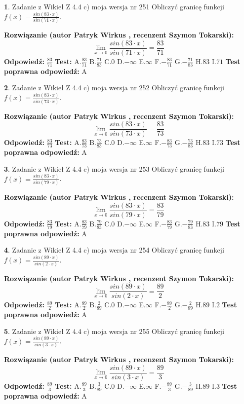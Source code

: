 \documentclass[12pt, a4paper]{article}
\theoremstyle{definition} %
\newtheorem{zad}{}
\newcommand{\zadStart}[1]{\begin{zad}#1\newline}
\newcommand{\zadStop}{\end{zad}}
\newcommand{\rozwStart}[2]{\noindent \textbf{Rozwiązanie (autor #1 , recenzent #2): }\newline}
\newcommand{\rozwStop}{\newline}
\newcommand{\odpStart}{\noindent \textbf{Odpowiedź:}\newline}
\newcommand{\odpStop}{\newline}
\newcommand{\testStart}{\noindent \textbf{Test:}\newline}
\newcommand{\testStop}{\newline}
\newcommand{\kluczStart}{\noindent \textbf{Test poprawna odpowiedź:}\newline}
\newcommand{\kluczStop}{\newline}
\begin{document}
\zadStart{Zadanie z Wikieł Z 4.4 c) moja wersja nr 251}
Obliczyć granicę funkcji $f(x)=\frac{sin(83\cdot x)}{sin(71\cdot x)}$.
\zadStop
\rozwStart{Patryk Wirkus}{Szymon Tokarski}
$$\lim\limits_{x\to 0}\frac{sin(83\cdot x)}{sin(71\cdot x)}=
\frac{83}{71}$$
\rozwStop
\odpStart
$\frac{83}{71}$
\odpStop
\testStart
A.$\frac{83}{71}$
B.$\frac{71}{83}$
C.$0$
D.$-\infty$
E.$\infty$
F.$-\frac{83}{71}$
G.$-\frac{71}{83}$
H.$83$
I.$71$
\testStop
\kluczStart
A
\kluczStop



\zadStart{Zadanie z Wikieł Z 4.4 c) moja wersja nr 252}
Obliczyć granicę funkcji $f(x)=\frac{sin(83\cdot x)}{sin(73\cdot x)}$.
\zadStop
\rozwStart{Patryk Wirkus}{Szymon Tokarski}
$$\lim\limits_{x\to 0}\frac{sin(83\cdot x)}{sin(73\cdot x)}=
\frac{83}{73}$$
\rozwStop
\odpStart
$\frac{83}{73}$
\odpStop
\testStart
A.$\frac{83}{73}$
B.$\frac{73}{83}$
C.$0$
D.$-\infty$
E.$\infty$
F.$-\frac{83}{73}$
G.$-\frac{73}{83}$
H.$83$
I.$73$
\testStop
\kluczStart
A
\kluczStop



\zadStart{Zadanie z Wikieł Z 4.4 c) moja wersja nr 253}
Obliczyć granicę funkcji $f(x)=\frac{sin(83\cdot x)}{sin(79\cdot x)}$.
\zadStop
\rozwStart{Patryk Wirkus}{Szymon Tokarski}
$$\lim\limits_{x\to 0}\frac{sin(83\cdot x)}{sin(79\cdot x)}=
\frac{83}{79}$$
\rozwStop
\odpStart
$\frac{83}{79}$
\odpStop
\testStart
A.$\frac{83}{79}$
B.$\frac{79}{83}$
C.$0$
D.$-\infty$
E.$\infty$
F.$-\frac{83}{79}$
G.$-\frac{79}{83}$
H.$83$
I.$79$
\testStop
\kluczStart
A
\kluczStop



\zadStart{Zadanie z Wikieł Z 4.4 c) moja wersja nr 254}
Obliczyć granicę funkcji $f(x)=\frac{sin(89\cdot x)}{sin(2\cdot x)}$.
\zadStop
\rozwStart{Patryk Wirkus}{Szymon Tokarski}
$$\lim\limits_{x\to 0}\frac{sin(89\cdot x)}{sin(2\cdot x)}=
\frac{89}{2}$$
\rozwStop
\odpStart
$\frac{89}{2}$
\odpStop
\testStart
A.$\frac{89}{2}$
B.$\frac{2}{89}$
C.$0$
D.$-\infty$
E.$\infty$
F.$-\frac{89}{2}$
G.$-\frac{2}{89}$
H.$89$
I.$2$
\testStop
\kluczStart
A
\kluczStop



\zadStart{Zadanie z Wikieł Z 4.4 c) moja wersja nr 255}
Obliczyć granicę funkcji $f(x)=\frac{sin(89\cdot x)}{sin(3\cdot x)}$.
\zadStop
\rozwStart{Patryk Wirkus}{Szymon Tokarski}
$$\lim\limits_{x\to 0}\frac{sin(89\cdot x)}{sin(3\cdot x)}=
\frac{89}{3}$$
\rozwStop
\odpStart
$\frac{89}{3}$
\odpStop
\testStart
A.$\frac{89}{3}$
B.$\frac{3}{89}$
C.$0$
D.$-\infty$
E.$\infty$
F.$-\frac{89}{3}$
G.$-\frac{3}{89}$
H.$89$
I.$3$
\testStop
\kluczStart
A
\kluczStop
\end{document}
